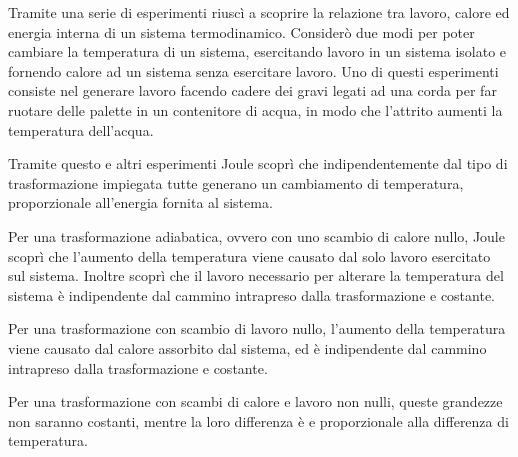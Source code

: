 \documentclass{article}
\numberwithin{equation}{subsection}
\begin{document}
Tramite una serie di esperimenti riuscì 
a scoprire la relazione tra lavoro, calore ed energia interna di un sistema termodinamico. 
Considerò due modi per poter cambiare la temperatura di un 
sistema, esercitando lavoro in un sistema isolato e fornendo 
calore ad un sistema senza esercitare lavoro. Uno di questi 
esperimenti consiste nel generare lavoro facendo cadere dei 
gravi legati ad una corda per far ruotare delle palette in 
un contenitore di acqua, in modo che l'attrito aumenti la temperatura dell'acqua. 


Tramite questo e altri esperimenti Joule scoprì che indipendentemente dal tipo di trasformazione  
impiegata tutte generano un cambiamento di temperatura, proporzionale all'energia fornita al sistema. 


Per una trasformazione adiabatica, ovvero con uno scambio di calore nullo, Joule scoprì che l'aumento della 
temperatura viene causato dal solo lavoro esercitato sul sistema. Inoltre scoprì 
che il lavoro necessario per alterare la temperatura del sistema è 
indipendente dal cammino intrapreso dalla trasformazione e 
costante. 



Per una trasformazione con scambio di lavoro nullo, l'aumento 
della temperatura viene causato dal calore assorbito dal 
sistema, ed è indipendente dal cammino intrapreso dalla trasformazione 
e costante.



Per una trasformazione con scambi di calore e lavoro non nulli, queste grandezze non saranno costanti, mentre la loro differenza è e proporzionale alla differenza 
di temperatura.  
\end{document}
